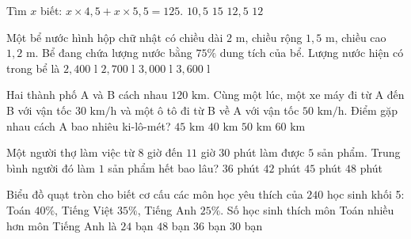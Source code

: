 \begin{ex} %
Tìm $x$ biết: $x \times 4{,}5 + x \times 5{,}5 = 125$.
\choice
{$10{,}5$}
{$15$}
{\True $12{,}5$}
{$12$}
\end{ex}

\begin{ex} %
Một bể nước hình hộp chữ nhật có chiều dài $2\text{ m}$, chiều rộng $1{,}5\text{ m}$, chiều cao $1{,}2\text{ m}$. Bể đang chứa lượng nước bằng $75\%$ dung tích của bể. Lượng nước hiện có trong bể là
\choice
{$2,400\text{ l}$}
{\True $2,700\text{ l}$}
{$3,000\text{ l}$}
{$3,600\text{ l}$}
\end{ex}

\begin{ex} %
Hai thành phố A và B cách nhau $120\text{ km}$. Cùng một lúc, một xe máy đi từ A đến B với vận tốc $30\text{ km/h}$ và một ô tô đi từ B về A với vận tốc $50\text{ km/h}$. Điểm gặp nhau cách A bao nhiêu ki-lô-mét?
\choice
{\True $45\text{ km}$}
{$40\text{ km}$}
{$50\text{ km}$}
{$60\text{ km}$}
\end{ex}

\begin{ex} %
Một người thợ làm việc từ $8$ giờ đến $11$ giờ $30$ phút làm được $5$ sản phẩm. Trung bình người đó làm $1$ sản phẩm hết bao lâu?
\choice
{$36$ phút}
{\True $42$ phút}
{$45$ phút}
{$48$ phút}
\end{ex}

\begin{ex} %
Biểu đồ quạt tròn cho biết cơ cấu các môn học yêu thích của $240$ học sinh khối 5: Toán $40\%$, Tiếng Việt $35\%$, Tiếng Anh $25\%$. Số học sinh thích môn Toán nhiều hơn môn Tiếng Anh là
\choice
{$24$ bạn}
{$48$ bạn}
{\True $36$ bạn}
{$30$ bạn}
\end{ex}

